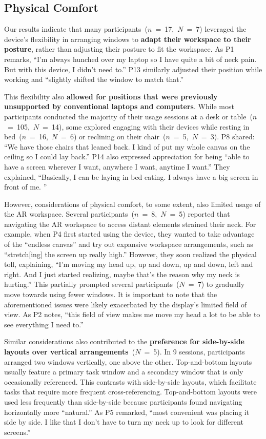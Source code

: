 \subsection{Physical Comfort}
\label{sec:ergonomics}
Our results
indicate that many participants~($n$~=~17,~$N$~=~7) leveraged the device's flexibility in arranging windows to \textbf{adapt their workspace to their posture}, rather than adjusting their posture to fit the workspace.
As P1 remarks, ``I'm always hunched over my laptop so I have quite a bit of neck pain. But with this device, I didn't need to.''
P13 similarly adjusted their position while working and ``slightly shifted the window to match that.''

This flexibility also \textbf{allowed for positions that were previously unsupported by conventional laptops and computers}.
While most participants conducted the majority of their usage sessions at a desk or table~($n$~=~105,~$N$~=~14),
some explored engaging with their devices while resting in bed~($n$~=~16,~$N$~=~6) 
or reclining on their chair~($n$~=~5,~$N$~=~3).
P8 shared: ``We have those chairs that leaned back. I kind of put my whole canvas on the ceiling so I could lay back.''
P14 also expressed appreciation for being ``able to have a screen wherever I want, anywhere I want, anytime I want.'' 
They explained, ``Basically, I can be laying in bed eating. I always have a big screen in front of me. ''

However, considerations of physical comfort, to some extent, also limited usage of the AR workspace.
Several participants~($n$~=~8,~$N$~=~5)
reported that navigating the AR workspace to access distant elements strained their neck.
For example, when P4 first started using the device, they wanted to take advantage of the ``endless canvas'' and try out expansive workspace arrangements, such as ``stretch[ing] the screen up really high.''
However, 
they soon realized the physical toll, explaining, 
``I'm moving my head up, up and down, up and down, left and right. And I just started realizing, maybe that's the reason why my neck is hurting.''
This partially prompted several participants~($N$~=~7) 
to gradually move towards using fewer windows.
It is important to note that the aforementioned issues were likely exacerbated by the display's limited field of view.
As P2 notes, ``this field of view makes me move my head a lot to be able to see everything I need to.'' 

Similar considerations also contributed to the \textbf{preference for side-by-side layouts over vertical arrangements}~($N$~=~5).
In 9 sessions, 
participants arranged two windows vertically, one above the other.
Top-and-bottom layouts usually feature a primary task window and a secondary window that is only occasionally referenced. 
This contrasts with side-by-side layouts, which facilitate tasks that require more frequent cross-referencing.
Top-and-bottom layouts were used less frequently than side-by-side because participants found navigating horizontally more ``natural.'' 
As P5 remarked, ``most convenient was placing it side by side. I like that I don't have to turn my neck up to look for different screens.''

